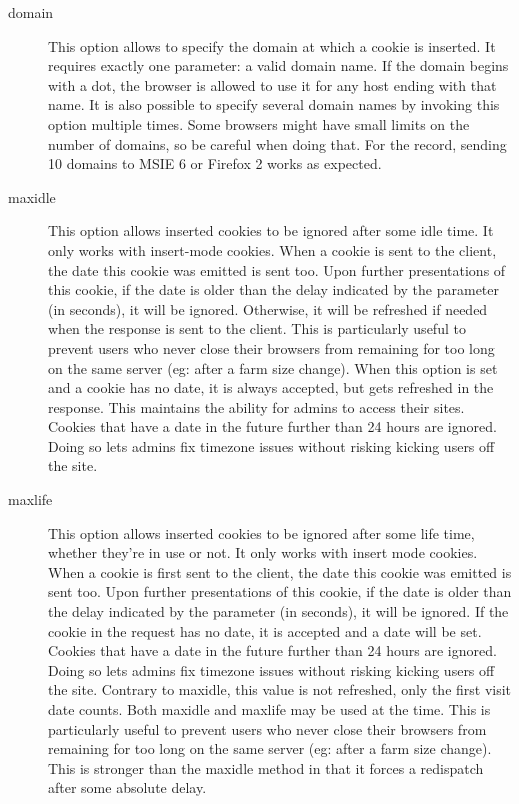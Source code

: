\begin{description}
  \item[domain]
              This option allows to specify the domain at which a cookie is
              inserted. It requires exactly one parameter: a valid domain
              name. If the domain begins with a dot, the browser is allowed to
              use it for any host ending with that name. It is also possible to
              specify several domain names by invoking this option multiple
              times. Some browsers might have small limits on the number of
              domains, so be careful when doing that. For the record, sending
              10 domains to MSIE 6 or Firefox 2 works as expected.

  \item[maxidle]
              This option allows inserted cookies to be ignored after some idle
              time. It only works with insert-mode cookies. When a cookie is
              sent to the client, the date this cookie was emitted is sent too.
              Upon further presentations of this cookie, if the date is older
              than the delay indicated by the parameter (in seconds), it will
              be ignored. Otherwise, it will be refreshed if needed when the
              response is sent to the client. This is particularly useful to
              prevent users who never close their browsers from remaining for
              too long on the same server (eg: after a farm size change). When
              this option is set and a cookie has no date, it is always
              accepted, but gets refreshed in the response. This maintains the
              ability for admins to access their sites. Cookies that have a
              date in the future further than 24 hours are ignored. Doing so
              lets admins fix timezone issues without risking kicking users off
              the site.

  \item[maxlife]
              This option allows inserted cookies to be ignored after some life
              time, whether they're in use or not. It only works with insert
              mode cookies. When a cookie is first sent to the client, the date
              this cookie was emitted is sent too. Upon further presentations
              of this cookie, if the date is older than the delay indicated by
              the parameter (in seconds), it will be ignored. If the cookie in
              the request has no date, it is accepted and a date will be set.
              Cookies that have a date in the future further than 24 hours are
              ignored. Doing so lets admins fix timezone issues without risking
              kicking users off the site. Contrary to maxidle, this value is
              not refreshed, only the first visit date counts. Both maxidle and
              maxlife may be used at the time. This is particularly useful to
              prevent users who never close their browsers from remaining for
              too long on the same server (eg: after a farm size change). This
              is stronger than the maxidle method in that it forces a
              redispatch after some absolute delay.
  \end{description}

